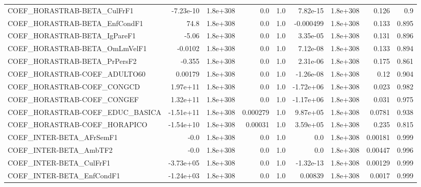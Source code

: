 \begin{tabular}{lrrrrrrrr}
COEF\_HORASTRAB-BETA\_CulFrF1           &   -7.23e-10 &     1.8e+308 &        0.0 &      1.0 &   7.82e-15 &    1.8e+308 &        0.126 &           0.9 \\
COEF\_HORASTRAB-BETA\_EnfCondF1         &        74.8 &     1.8e+308 &        0.0 &      1.0 &  -0.000499 &    1.8e+308 &        0.133 &         0.895 \\
COEF\_HORASTRAB-BETA\_IgPareF1          &       -5.06 &     1.8e+308 &        0.0 &      1.0 &   3.35e-05 &    1.8e+308 &        0.131 &         0.896 \\
COEF\_HORASTRAB-BETA\_OmLmVelF1         &     -0.0102 &     1.8e+308 &        0.0 &      1.0 &   7.12e-08 &    1.8e+308 &        0.133 &         0.894 \\
COEF\_HORASTRAB-BETA\_PrPersF2          &      -0.355 &     1.8e+308 &        0.0 &      1.0 &   2.31e-06 &    1.8e+308 &        0.175 &         0.861 \\
COEF\_HORASTRAB-COEF\_ADULTO60          &     0.00179 &     1.8e+308 &        0.0 &      1.0 &  -1.26e-08 &    1.8e+308 &         0.12 &         0.904 \\
COEF\_HORASTRAB-COEF\_CONGCD            &    1.97e+11 &     1.8e+308 &        0.0 &      1.0 &  -1.72e+06 &    1.8e+308 &        0.023 &         0.982 \\
COEF\_HORASTRAB-COEF\_CONGEF            &    1.32e+11 &     1.8e+308 &        0.0 &      1.0 &  -1.17e+06 &    1.8e+308 &        0.031 &         0.975 \\
COEF\_HORASTRAB-COEF\_EDUC\_BASICA       &   -1.51e+11 &     1.8e+308 &   0.000279 &      1.0 &   9.87e+05 &    1.8e+308 &       0.0781 &         0.938 \\
COEF\_HORASTRAB-COEF\_HORAPICO          &   -1.54e+10 &     1.8e+308 &    0.00031 &      1.0 &   3.59e+05 &    1.8e+308 &        0.235 &         0.815 \\
COEF\_INTER-BETA\_AFrSemF1              &        -0.0 &     1.8e+308 &        0.0 &      1.0 &        0.0 &    1.8e+308 &      0.00181 &         0.999 \\
COEF\_INTER-BETA\_AmbTF2                &        -0.0 &     1.8e+308 &        0.0 &      1.0 &        0.0 &    1.8e+308 &      0.00447 &         0.996 \\
COEF\_INTER-BETA\_CulFrF1               &   -3.73e+05 &     1.8e+308 &        0.0 &      1.0 &  -1.32e-13 &    1.8e+308 &      0.00129 &         0.999 \\
COEF\_INTER-BETA\_EnfCondF1             &   -1.24e+03 &     1.8e+308 &        0.0 &      1.0 &    0.00839 &    1.8e+308 &       0.0017 &         0.999 \\

\end{tabular}
